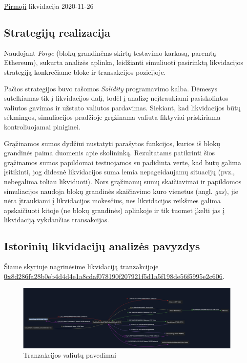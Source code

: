\documentclass{VUMIFPSkursinis}
\begin{document}
\href{https://bscscan.com/tx/0x2434f5aee00e1135c66fb42203d506351ed2b6629e01af5daee37f652e4d67b8}{Pirmoji}
likvidacija 2020-11-26

\subsection{Strategijų realizacija}

Naudojant \textit{Forge} (blokų grandinėms skirtą testavimo karkasą, paremtą Ethereum), sukurta analizės aplinka, leidžianti simuliuoti pasirinktą likvidacijos strategiją konkrečiame bloke ir transakcijos pozicijoje.

Pačios strategijos buvo rašomos \textit{Solidity} programavimo kalba. Dėmesys sutelkiamas tik į likvidacijos dalį, todėl į analizę neįtraukiami pasiskolintos valiutos gavimas ir užstato valiutos pardavimas. Siekiant, kad likvidacijos būtų sėkmingos, simuliacijos pradžioje grąžinama valiuta fiktyviai priskiriama kontroliuojamai piniginei.

Grąžinamos sumos dydžiui nustatyti parašytos funkcijos, kurios iš blokų grandinės paima duomenis apie skolininką. Rezultatams patikrinti šios grąžinamos sumos papildomai testuojamos su padidinta verte, kad būtų galima įsitikinti, jog didesnė likvidacijos suma lemia nepageidaujamų situacijų (pvz., nebegalima toliau likviduoti). Nors grąžinamų sumų skaičiavimai ir papildomos simuliacijos naudoja blokų grandinės skaičiavimo kuro vienetus (angl. \textit{gas}), jie nėra įtraukiami į likvidacijos mokesčius, nes likvidacijos reikšmes galima apskaičiuoti kitoje (ne blokų grandinės)  aplinkoje ir tik tuomet įkelti jas į likvidaciją vykdančias transakcijas.

\subsection{Istorinių likvidacijų analizės pavyzdys}

\small
Šiame skyriuje nagrinėsime likvidaciją tranzakcijoje \\\href{https://app.blocksec.com/explorer/tx/bsc/0x8d286fa28b0eb4d4d4e1a8cdaf078190f207921f5d1a5f198de56f5995e2c606}{0x8d286fa28b0eb4d4d4e1a8cdaf078190f207921f5d1a5f198de56f5995e2c606}.

\begin{figure}[H]
  \centering
  \includegraphics[scale=0.3]{img/liquidation_example.png}
  \caption{Tranzakcijos valiutų pavedimai \cite{liqpvz}}
  \label{img:liquidation_example}
\end{figure}
\end{document}
